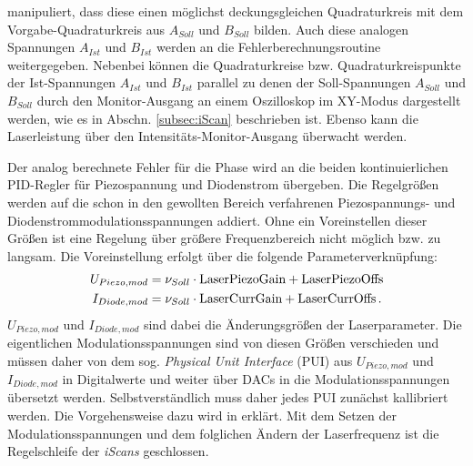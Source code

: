 manipuliert, dass diese einen möglichst deckungsgleichen Quadraturkreis mit dem
Vorgabe-Quadraturkreis aus $A_{Soll}$ und $B_{Soll}$ bilden. Auch diese analogen
Spannungen $A_{Ist}$ und $B_{Ist}$ werden an die Fehlerberechnungsroutine
weitergegeben. Nebenbei können die Quadraturkreise bzw. Quadraturkreispunkte der
Ist-Spannungen $A_{Ist}$ und $B_{Ist}$ parallel zu denen der Soll-Spannungen
$A_{Soll}$ und $B_{Soll}$ durch den Monitor-Ausgang an einem Oszilloskop im
XY-Modus dargestellt werden, wie es in Abschn. \ref{subsec:iScan} beschrieben
ist. Ebenso kann die Laserleistung über den Intensitäts-Monitor-Ausgang
überwacht werden.\par Der analog berechnete Fehler für die Phase wird an die beiden
kontinuierlichen PID-Regler für Piezospannung und Diodenstrom übergeben. Die
Regelgrößen werden auf die schon in den gewollten Bereich verfahrenen
Piezospannungs- und Diodenstrommodulationsspannungen addiert. Ohne ein
Voreinstellen dieser Größen ist eine Regelung über größere Frequenzbereich nicht
möglich bzw. zu langsam. Die Voreinstellung erfolgt über die folgende
Parameterverknüpfung:
\begin{equation}\label{eq:iscan_PUs}
	\begin{split}
		U_{Piezo,mod}&=\nu_{Soll}\cdot\text{\lstinline|LaserPiezoGain|}+\text{\lstinline|LaserPiezoOffs|}\\
		I_{Diode,mod}&=\nu_{Soll}\cdot\text{\lstinline|LaserCurrGain|}+\text{\lstinline|LaserCurrOffs|}\,.
	\end{split}
\end{equation}
$U_{Piezo,mod}$ und $I_{Diode,mod}$ sind dabei die Änderungsgrößen der
Laserparameter. Die eigentlichen Modulationsspannungen
sind von diesen Größen verschieden und müssen daher von dem sog.
\textit{Physical Unit Interface} (PUI) aus $U_{Piezo,mod}$ und $I_{Diode,mod}$ in Digitalwerte und weiter über DACs in die Modulationsspannungen übersetzt werden.
Selbstverständlich muss daher jedes PUI zunächst kallibriert werden. Die
Vorgehensweise dazu wird in \cite{iscan_hardware_guide}
erklärt. Mit dem Setzen der Modulationsspannungen und dem folglichen Ändern der
Laserfrequenz ist die Regelschleife der \textit{iScans} geschlossen.

